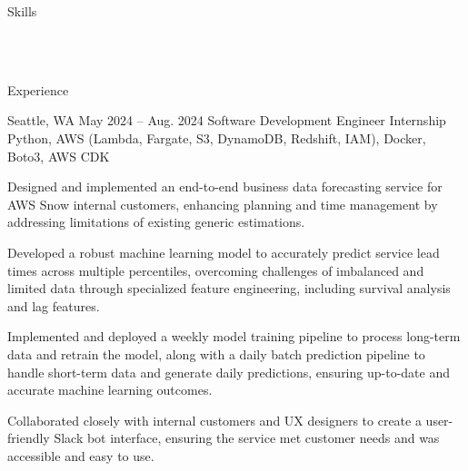 \documentclass[10pt]{article}
\begin{document}
\pagestyle{empty}


\begin{customsectionnoskip}{Skills}

     \\ 
     \\ 

\end{customsectionnoskip}

\begin{customsection}{Experience}

     {Seattle, WA} {May 2024 -- Aug. 2024}
    {Software Development Engineer Internship}
    {Python, AWS (Lambda, Fargate, S3, DynamoDB, Redshift, IAM), Docker, Boto3, AWS CDK}
    {
        \item Designed and implemented an end-to-end business data forecasting service for AWS Snow internal customers, enhancing planning and time management by addressing limitations of existing generic estimations.
        \item Developed a robust machine learning model to accurately predict service lead times across multiple percentiles, overcoming challenges of imbalanced and limited data through specialized feature engineering, including survival analysis and lag features. 
        \item Implemented and deployed a weekly model training pipeline to process long-term data and retrain the model, along with a daily batch prediction pipeline to handle short-term data and generate daily predictions, ensuring up-to-date and accurate machine learning outcomes.
        \item Collaborated closely with internal customers and UX designers to create a user-friendly Slack bot interface, ensuring the service met customer needs and was accessible and easy to use.
    }
    
\end{customsection}
\end{document}
